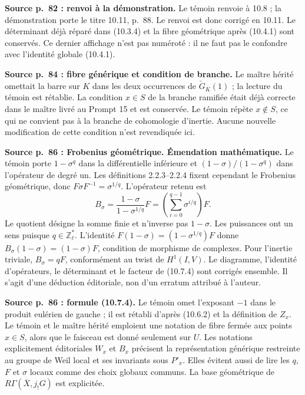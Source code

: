 \documentclass[10pt,letterpaper]{article}
\newcommand{\Z}{\mathbb Z}
\begin{document}
\begin{description}[style=nextline,leftmargin=2.6em,labelwidth=2.2em,font=\normalfont\bfseries]
\item[E01] \textbf{Source p.~82 : renvoi à la démonstration.} Le témoin renvoie à 10.8 ; la démonstration porte le titre 10.11, p.~88. Le renvoi est donc corrigé en 10.11. Le déterminant déjà réparé dans (10.3.4) et la fibre géométrique après (10.4.1) sont conservés. Ce dernier affichage n'est pas numéroté : il ne faut pas le confondre avec l'identité globale (10.4.1).

\item[E02] \textbf{Source p.~84 : fibre générique et condition de branche.} Le maître hérité omettait la barre sur \(K\) dans les deux occurrences de \(\check G_{\overline K}(1)\) ; la lecture du témoin est rétablie. La condition \(x\in S\) de la branche ramifiée était déjà correcte dans le maître livré au Prompt 15 et est conservée. Le témoin répète \(x\notin S\), ce qui ne convient pas à la branche de cohomologie d'inertie. Aucune nouvelle modification de cette condition n'est revendiquée ici.

\item[E03] \textbf{Source p.~86 : Frobenius géométrique. Émendation mathématique.} Le témoin porte \(1-\sigma^q\) dans la différentielle inférieure et \((1-\sigma)/(1-\sigma^q)\) dans l'opérateur de degré un. Les définitions 2.2.3--2.2.4 fixent cependant le Frobenius géométrique, donc \(F\sigma F^{-1}=\sigma^{1/q}\). L'opérateur retenu est
\[
 B_\sigma=\frac{1-\sigma}{1-\sigma^{1/q}}F=\left(\sum_{i=0}^{q-1}\sigma^{i/q}\right)F.
\]
Le quotient désigne la somme finie et n'inverse pas \(1-\sigma\). Les puissances ont un sens puisque \(q\in\Z_\ell^*\). L'identité \(F(1-\sigma)=(1-\sigma^{1/q})F\) donne \(B_\sigma(1-\sigma)=(1-\sigma)F\), condition de morphisme de complexes. Pour l'inertie triviale, \(B_\sigma=qF\), conformément au twist de \(H^1(I,V)\). Le diagramme, l'identité d'opérateurs, le déterminant et le facteur de (10.7.4) sont corrigés ensemble. Il s'agit d'une déduction éditoriale, non d'un erratum attribué à l'auteur.

\item[E04] \textbf{Source p.~86 : formule (10.7.4).} Le témoin omet l'exposant \(-1\) dans le produit eulérien de gauche ; il est rétabli d'après (10.6.2) et la définition de \(Z_x\). Le témoin et le maître hérité emploient une notation de fibre fermée aux points \(x\in S\), alors que le faisceau est donné seulement sur \(U\). Les notations explicitement éditoriales \(W_x\) et \(B_x\) précisent la représentation générique restreinte au groupe de Weil local et ses invariants sous \(P'_x\). Elles évitent aussi de lire les \(q\), \(F\) et \(\sigma\) locaux comme des choix globaux communs. La base géométrique de \(R\Gamma(\overline X,j_!G)\) est explicitée.


\end{description}
\end{document}

